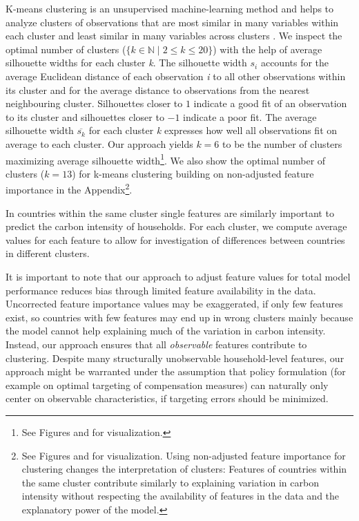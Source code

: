 \documentclass[12pt, a4paper]{article}
\begin{document}
K-means clustering is an unsupervised machine-learning method and helps to analyze clusters of observations that are most similar in many variables within each cluster and least similar in many variables across clusters \autocite{MacQueen.1967}. We inspect the optimal number of clusters ($\{k \in \mathbb{N} \mid 2  \leq k \leq 20 \}$) with the help of average silhouette widths \autocite{Rousseeuw.1987} for each cluster \textit{k}. The silhouette width $s_{i}$ accounts for the average Euclidean distance of each observation \textit{i} to all other observations within its cluster and for the average distance to observations from the nearest neighbouring cluster. Silhouettes closer to $1$ indicate a good fit of an observation to its cluster and silhouettes closer to $-1$ indicate a poor fit. The average silhouette width $\overline{s_{k}}$ for each cluster \textit{k} expresses how well all observations fit on average to each cluster. Our approach yields $k = 6$ to be the number of clusters maximizing average silhouette width\footnote{See Figures and  for visualization.}. We also show the optimal number of clusters ($k = 13$) for k-means clustering building on non-adjusted feature importance in the Appendix\footnote{See Figures  and  for visualization. Using non-adjusted feature importance for clustering changes the interpretation of clusters: Features of countries within the same cluster contribute similarly to explaining variation in carbon intensity without respecting the availability of features in the data and the explanatory power of the model.}.

In countries within the same cluster single features are similarly important to predict the carbon intensity of households. For each cluster, we compute average values for each feature to allow for investigation of differences between countries in different clusters.%

It is important to note that our approach to adjust feature values for total model performance reduces bias through limited feature availability in the data. Uncorrected feature importance values may be exaggerated, if only few features exist, so countries with few features may end up in wrong clusters mainly because the model cannot help explaining much of the variation in carbon intensity. Instead, our approach ensures that all \textit{observable} features contribute to clustering. Despite many structurally unobservable household-level features, our approach might be warranted under the assumption that policy formulation (for example on optimal targeting of compensation measures) can naturally only center on observable characteristics, if targeting errors should be minimized.
\end{document}
